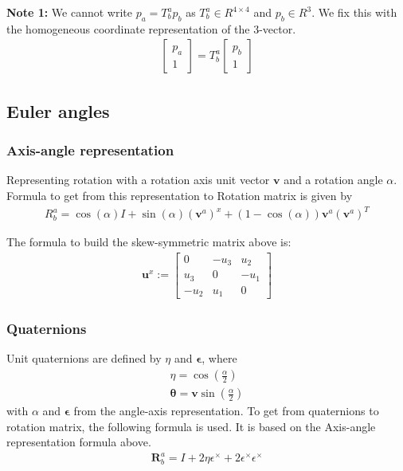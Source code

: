 \textbf{Note 1:} We cannot write $p_a=T_b^a p_b$ as $T_b^a\in R^{4 \times 4}$ and $p_b \in R^3$. We fix this with the homogeneous coordinate representation of the 3-vector. 
\begin{align}
    \begin{bmatrix}
    p_a \\ 1 
    \end{bmatrix}
    = T_b^a
    \begin{bmatrix}
    p_b \\ 1
    \end{bmatrix}
\end{align}

\subsection{Euler angles}
\subsubsection{Axis-angle representation}
Representing rotation with a rotation axis unit vector $\mathbf{v}$ and a rotation angle $\alpha$. Formula to get from this representation to Rotation matrix is given by
\begin{align}
    R_b^a = \cos(\alpha) I + \sin(\alpha) (\mathbf{v}^a)^x+(1-\cos(\alpha))\mathbf{v}^a(\mathbf{v}^a)^T
\end{align}

The formula to build the skew-symmetric matrix above is:
\begin{align}
    \mathbf{u}^x:=
    \begin{bmatrix}
    0 & -u_3 & u_2 \\
    u_3 & 0 & -u_1 \\
    -u_2 & u_1 & 0
    \end{bmatrix}
\end{align}

\subsubsection{Quaternions}

Unit quaternions are defined by $\eta$ and $\mathbf{\epsilon}$, where 
\begin{align}
    \eta = \cos(\frac{\alpha}{2}) \\
    \mathbf{\theta} = \mathbf{v} \sin(\frac{\alpha}{2})
\end{align}
with $\alpha$ and $\mathbf{\epsilon}$ from the angle-axis representation. To get from quaternions to rotation matrix, the following formula is used. It is based on the Axis-angle representation formula above. 
\begin{align}
    \mathbf{R}_b^a = I + 2\eta\epsilon^\times + 2\epsilon^\times\epsilon^\times
\end{align}


